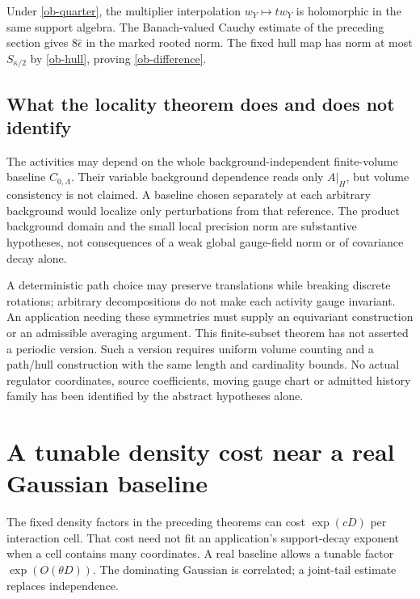 \documentclass[11pt]{article}
\begin{document}
Under \eqref{ob-quarter}, the multiplier interpolation
$w_Y\mapsto tw_Y$ is holomorphic in the same support algebra.
The Banach-valued Cauchy estimate of the preceding section
gives $8\widehat\epsilon$ in the marked rooted norm.
The fixed hull map has norm at most $S_{\kappa/2}$ by
\eqref{ob-hull}, proving \eqref{ob-difference}.

\subsection{What the locality theorem does and does not identify}

The activities may depend on the whole background-independent
finite-volume baseline $C_{0,\Lambda}$. Their variable background
dependence reads only $A|_H$, but volume consistency is not
claimed. A baseline chosen separately at each arbitrary
background would localize only perturbations from that reference.
The product background domain and the small local precision
norm are substantive hypotheses, not consequences of a weak
global gauge-field norm or of covariance decay alone.

A deterministic path choice may preserve translations while
breaking discrete rotations; arbitrary decompositions do not
make each activity gauge invariant. An application needing
these symmetries must supply an equivariant construction or
an admissible averaging argument.
This finite-subset theorem has not asserted a periodic version.
Such a version requires uniform volume counting and a path/hull
construction with the same length and cardinality bounds.
No actual regulator coordinates, source coefficients, moving
gauge chart or admitted history family has been identified by
the abstract hypotheses alone.


\section{A tunable density cost near a real Gaussian baseline}
\label{otg-section}

The fixed density factors in the preceding theorems can cost
$\exp(cD)$ per interaction cell. That cost need not fit an
application's support-decay exponent when a cell contains many
coordinates. A real baseline allows a tunable factor
$\exp(O(\theta D))$. The dominating Gaussian is correlated;
a joint-tail estimate replaces independence.
\end{document}
